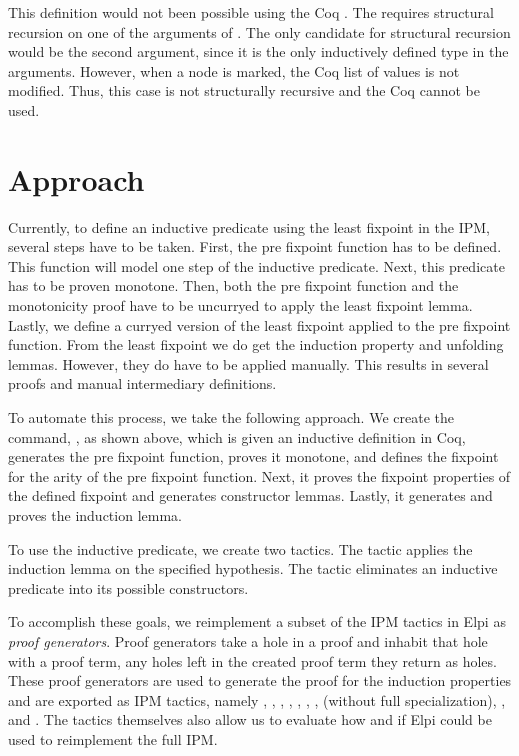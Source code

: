 \documentclass[thesis.tex]{subfiles}
\begin{document}
This definition would not been possible using the Coq . The  requires structural recursion on one of the arguments of . The only candidate for structural recursion would be the second argument, since it is the only inductively defined type in the arguments. However, when a node is marked, the Coq list of values is not modified. Thus, this case is not structurally recursive and the Coq  cannot be used.

\section{Approach}
Currently, to define an inductive predicate using the least fixpoint in the IPM, several steps have to be taken. First, the pre fixpoint function has to be defined. This function will model one step of the inductive predicate. Next, this predicate has to be proven monotone. Then, both the pre fixpoint function and the monotonicity proof have to be uncurryed to apply the least fixpoint lemma. Lastly, we define a curryed version of the least fixpoint applied to the pre fixpoint function. From the least fixpoint we do get the induction property and unfolding lemmas. However, they do have to be applied manually. This results in several proofs and manual intermediary definitions.

To automate this process, we take the following approach. We create the command, , as shown above, which is given an inductive definition in Coq, generates the pre fixpoint function, proves it monotone, and defines the fixpoint for the arity of the pre fixpoint function. Next, it proves the fixpoint properties of the defined fixpoint and generates constructor lemmas. Lastly, it generates and proves the induction lemma.

To use the inductive predicate, we create two tactics. The  tactic applies the induction lemma on the specified hypothesis. The  tactic eliminates an inductive predicate into its possible constructors.

To accomplish these goals, we reimplement a subset of the IPM tactics in Elpi as \emph{proof generators}. Proof generators take a hole in a proof and inhabit that hole with a proof term, any holes left in the created proof term they return as holes. These proof generators are used to generate the proof for the induction properties and are exported as IPM tactics, namely , , , , , , ,  (without full specialization), , and . The tactics themselves also allow us to evaluate how and if Elpi could be used to reimplement the full IPM.
\end{document}
